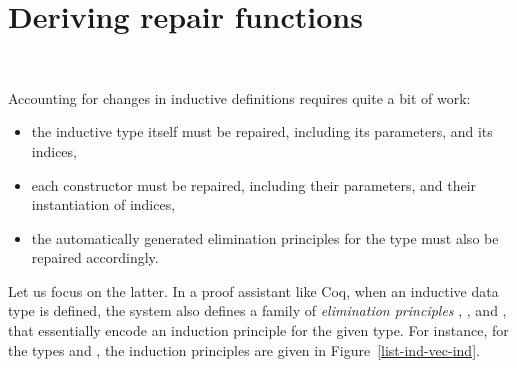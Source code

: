 \section{Deriving repair functions}~\label{deriving}

Accounting for changes in inductive definitions requires quite a bit of work:

\begin{itemize}

\item the inductive type itself must be repaired, including its parameters, and
its indices,

\item each constructor must be repaired, including their parameters, and their
instantiation of indices,

\item the automatically generated elimination principles for the type must also
be repaired accordingly.

\end{itemize}%
%
Let us focus on the latter.  In a proof assistant like Coq, when an inductive
data type  is defined, the system also defines a family of
\textit{elimination principles} , , and
, that essentially encode an induction principle for the given
type.  For instance, for the types  and , the
induction principles are given in Figure~\ref{list-ind-vec-ind}.

